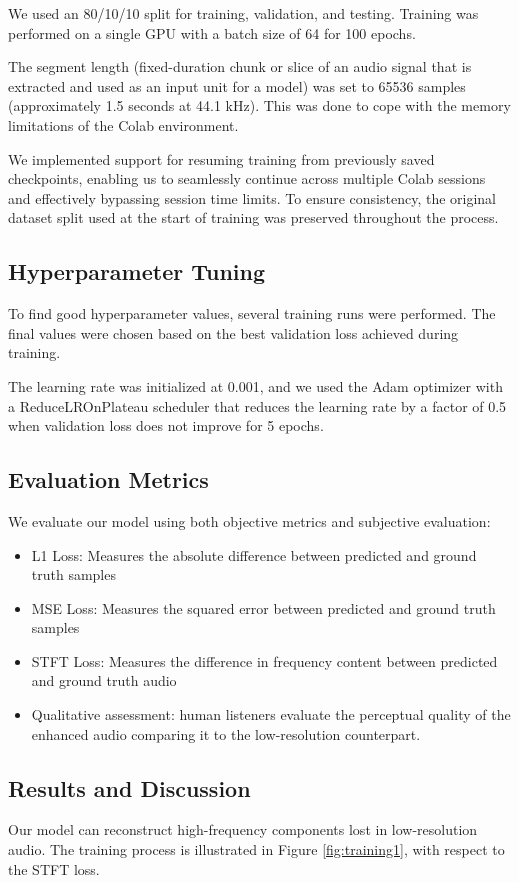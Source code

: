 \documentclass{article}
\begin{document}
We used an 80/10/10 split for training, validation, and testing. Training was performed on a single GPU with a batch size of 64 for 100 epochs.

The segment length (fixed-duration chunk or slice of an audio signal that is extracted and used as an input unit for a model) was set to 65536 samples (approximately 1.5 seconds at 44.1 kHz).
This was done to cope with the memory limitations of the Colab environment.

We implemented support for resuming training from previously saved checkpoints, enabling us to seamlessly continue across multiple Colab sessions and effectively bypassing session time limits.
To ensure consistency, the original dataset split used at the start of training was preserved throughout the process.

\subsection{Hyperparameter Tuning}
To find good hyperparameter values, several training runs were performed.
The final values were chosen based on the best validation loss achieved during training.  

The learning rate was initialized at 0.001, and we used the Adam optimizer with a ReduceLROnPlateau scheduler that reduces the learning rate by a factor of 0.5 when validation loss does not improve for 5 epochs.

\subsection{Evaluation Metrics}
We evaluate our model using both objective metrics and subjective evaluation:
\begin{itemize}
    \item L1 Loss: Measures the absolute difference between predicted and ground truth samples
    \item MSE Loss: Measures the squared error between predicted and ground truth samples
    \item STFT Loss: Measures the difference in frequency content between predicted and ground truth audio
    \item Qualitative assessment: human listeners evaluate the perceptual quality of the enhanced audio comparing it to the low-resolution counterpart.
\end{itemize}

\subsection{Results and Discussion}
Our model can reconstruct high-frequency components lost in low-resolution audio. 
The training process is illustrated in Figure \ref{fig:training1}, with respect to the STFT loss.
\end{document}
